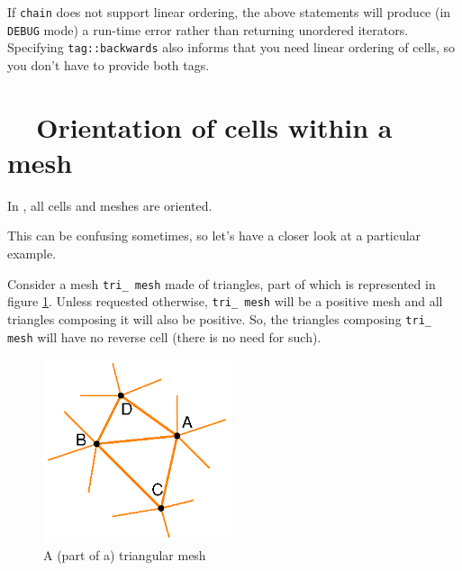 If {\small\tt chain} does not support linear ordering, the above statements will produce
(in {\small\tt DEBUG} mode) a run-time error rather than returning unordered iterators.
Specifying {\small\tt\textcolor{tag}{tag}::backwards} also informs {\maniFEM} that you need
linear ordering of cells, so you don't have to provide both tags.


\section{~~Orientation of cells within a mesh}\label{\numb section 9.\numb parag 5}

In \maniFEM, all cells and meshes are oriented.

This can be confusing sometimes, so let's have a closer look at a particular example.

Consider a mesh {\small\tt tri\_\,mesh} made of triangles, part of which is represented
in figure \ref{\numb section 9.\numb fig 2}.
Unless requested otherwise, {\small\tt tri\_\,mesh} will be a positive mesh and all triangles
composing it will also be positive.
So, the triangles composing {\small\tt tri\_\,mesh} will have no reverse cell
(there is no need for such).

\begin{figure}[ht] \centering
  \includegraphics[width=55mm]{malha-tri}
  \caption{A (part of a) triangular mesh}
  \label{\numb section 9.\numb fig 2}
\end{figure}

